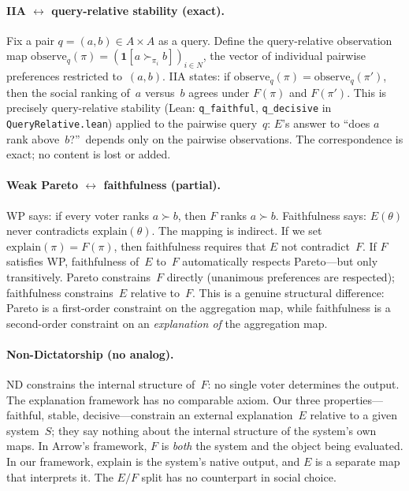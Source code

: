 \paragraph{IIA \boldmath$\longleftrightarrow$ query-relative stability
  (exact).}
Fix a pair $q = (a,b) \in A \times A$ as a query. Define the
query-relative observation map
$\mathrm{observe}_q(\pi) = (\mathbf{1}[a \succ_{\pi_i} b])_{i \in N}$,
the vector of individual pairwise preferences restricted to~$(a,b)$.
IIA states: if $\mathrm{observe}_q(\pi) = \mathrm{observe}_q(\pi')$,
then the social ranking of~$a$ versus~$b$ agrees under $F(\pi)$ and
$F(\pi')$. This is precisely query-relative stability
(Lean: \texttt{q\_faithful}, \texttt{q\_decisive} in
\texttt{QueryRelative.lean}) applied to the pairwise query~$q$:
$E$'s answer to ``does $a$ rank above~$b$?''\ depends only on the
pairwise observations. The correspondence is exact; no content is
lost or added.

\paragraph{Weak Pareto \boldmath$\longleftrightarrow$ faithfulness
  (partial).}
WP says: if every voter ranks $a \succ b$, then $F$ ranks $a \succ b$.
Faithfulness says: $E(\theta)$ never contradicts
$\mathrm{explain}(\theta)$. The mapping is indirect. If we set
$\mathrm{explain}(\pi) = F(\pi)$, then faithfulness requires that
$E$ not contradict~$F$. If $F$ satisfies WP, faithfulness of~$E$
to~$F$ automatically respects Pareto---but only transitively.
Pareto constrains~$F$ directly (unanimous preferences are respected);
faithfulness constrains~$E$ relative to~$F$. This is a genuine
structural difference: Pareto is a first-order constraint on the
aggregation map, while faithfulness is a second-order constraint on
an \emph{explanation of} the aggregation map.

\paragraph{Non-Dictatorship (no analog).}
ND constrains the internal structure of~$F$: no single voter
determines the output. The explanation framework has no comparable
axiom. Our three properties---faithful, stable, decisive---constrain
an external explanation~$E$ relative to a given system~$S$; they
say nothing about the internal structure of the system's own
maps. In Arrow's framework, $F$ is \emph{both} the system
and the object being evaluated. In our framework, $\mathrm{explain}$
is the system's native output, and $E$ is a separate map that
interprets it. The $E/F$ split has no counterpart in social choice.

